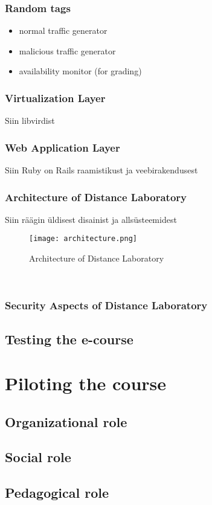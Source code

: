 \subsubsection{Random tags}
\begin{itemize}
	\item normal traffic generator
	\item malicious traffic generator
	\item availability monitor (for grading)
\end{itemize}

\subsubsection{Virtualization Layer}
Siin libvirdist
\subsubsection{Web Application Layer}
Siin Ruby on Rails raamistikust ja veebirakendusest
\subsubsection{Architecture of Distance Laboratory}
Siin räägin üldisest disainist ja allsüsteemidest
\
\begin{figure}[ht]
\centering
\texttt{[image: architecture.png]}
\caption{Architecture of Distance Laboratory}
\label{fig:Architecture of Distance Laboratory}
\end{figure}
\

\subsubsection{Security Aspects of Distance Laboratory}

\subsection{Testing the e-course}
\section{Piloting the course}
\subsection{Organizational role}
\subsection{Social role}
\subsection{Pedagogical role}